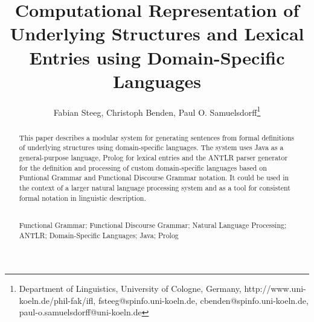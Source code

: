 \documentclass[a4paper, halfparskip, onecolumn, abstractoff, final]{scrartcl}
\begin{document}
\subject{Paper for \emph{Advances in FDG} based on a Poster presented at ICFG12}
\title{\Large Computational Representation of Underlying Structures and Lexical Entries using Domain-Specific Languages}
\author{Fabian Steeg, Christoph Benden, Paul O. Samuelsdorff\footnote{Department of Linguistics, University of Cologne, Germany, http://www.uni-koeln.de/phil-fak/ifl, fsteeg@spinfo.uni-koeln.de, cbenden@spinfo.uni-koeln.de, paul-o.samuelsdorff@uni-koeln.de}}

\maketitle

\begin{abstract}This paper describes a modular system for generating sentences from formal definitions of underlying structures using domain-specific languages. The system uses Java as a general-purpose language, Prolog for lexical entries and the ANTLR parser generator for the definition and processing of custom domain-specific languages based on Funtional Grammar and Functional Discourse Grammar notation. It could be used in the context of a larger natural language processing system and as a tool for consistent formal notation in linguistic description.
\\\\\begin{center}
Functional Grammar; Functional Discourse Grammar; Natural Language Processing; ANTLR; Domain-Specific Languages; Java; Prolog
\end{center}
\end{abstract}
\doublespacing



\end{document}
